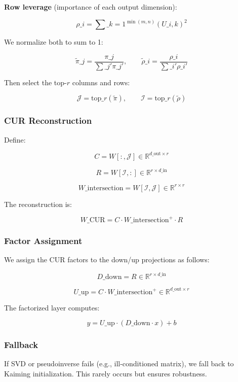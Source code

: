 \textbf{Row leverage} (importance of each output dimension):

\[
\rho\_i = \sum\_{k=1}^{\min(m, n)} (U\_{i, k})^2
\tag{4.4}
\]

We normalize both to sum to 1:

\[
\tilde{\pi}\_j = \frac{\pi\_j}{\sum\_{j'} \pi\_{j'}}, \qquad
\tilde{\rho}\_i = \frac{\rho\_i}{\sum\_{i'} \rho\_{i'}}
\tag{4.5}
\]

Then select the top-$r$ columns and rows:

\[
\mathcal{J} = \text{top}\_r(\tilde{\pi}), \qquad
\mathcal{I} = \text{top}\_r(\tilde{\rho})
\tag{4.6}
\]

\subsubsection{CUR Reconstruction}

Define:

\[
C = W[:, \mathcal{J}] \in \mathbb{R}^{d\_\text{out} \times r}
\tag{4.7}
\]

\[
R = W[\mathcal{I}, :] \in \mathbb{R}^{r \times d\_\text{in}}
\tag{4.8}
\]

\[
W\_\text{intersection} = W[\mathcal{I}, \mathcal{J}] \in \mathbb{R}^{r \times r}
\tag{4.9}
\]

The reconstruction is:

\[
W\_\text{CUR} = C \cdot W\_\text{intersection}^+ \cdot R
\tag{4.10}
\]

\subsubsection{Factor Assignment}

We assign the CUR factors to the down/up projections as follows:

\[
D\_\text{down} = R \in \mathbb{R}^{r \times d\_\text{in}}
\tag{4.11}
\]

\[
U\_\text{up} = C \cdot W\_\text{intersection}^+ \in \mathbb{R}^{d\_\text{out} \times r}
\tag{4.12}
\]

The factorized layer computes:

\[
y = U\_\text{up} \cdot (D\_\text{down} \cdot x) + b
\tag{4.13}
\]

\subsubsection{Fallback}

If SVD or pseudoinverse fails (e.g., ill-conditioned matrix), we fall back 
to Kaiming initialization. This rarely occurs but ensures robustness.

